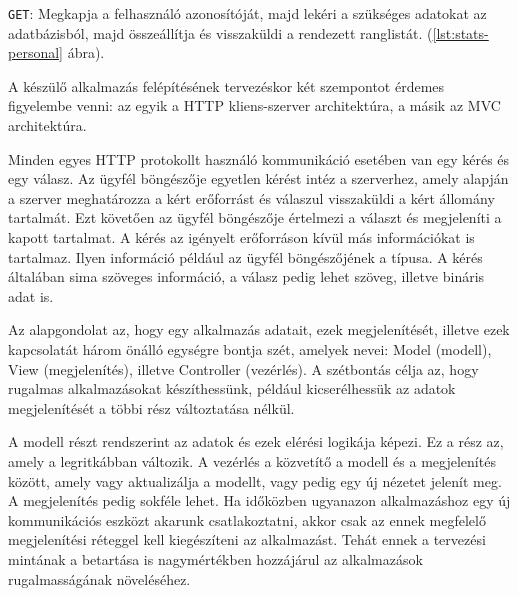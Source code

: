 \texttt{GET}: Megkapja a felhasználó azonosítóját, majd lekéri a szükséges adatokat az adatbázisból, majd összeállítja és visszaküldi a rendezett ranglistát. (\ref{lst:stats-personal} ábra).





A készülő alkalmazás felépítésének tervezéskor két szempontot érdemes figyelembe venni: az egyik a HTTP kliens-szerver architektúra, a másik az MVC architektúra.

Minden egyes HTTP protokollt használó kommunikáció esetében van egy kérés és egy válasz. Az ügyfél böngészője egyetlen kérést intéz a szerverhez, amely alapján a szerver meghatározza a kért erőforrást és válaszul visszaküldi a kért állomány tartalmát. Ezt követően az ügyfél böngészője értelmezi a választ és megjeleníti a kapott tartalmat. A kérés az igényelt erőforráson kívül más információkat is tartalmaz. Ilyen információ például az ügyfél böngészőjének a típusa. A kérés általában sima szöveges információ, a válasz pedig lehet szöveg, illetve bináris adat is. \cite{java-web-tech}

Az alapgondolat az, hogy egy alkalmazás adatait, ezek megjelenítését, illetve ezek kapcsolatát három önálló egységre bontja szét, amelyek nevei: Model (modell), View (megjelenítés), illetve Controller (vezérlés). A szétbontás célja az, hogy rugalmas alkalmazásokat készíthessünk, például kicserélhessük az adatok megjelenítését a többi rész változtatása nélkül.

A modell részt rendszerint az adatok és ezek elérési logikája képezi. Ez a rész az, amely a legritkábban változik. A vezérlés a közvetítő a modell és a megjelenítés között, amely vagy aktualizálja a modellt, vagy pedig egy új nézetet jelenít meg. A megjelenítés pedig sokféle lehet. Ha időközben ugyanazon alkalmazáshoz egy új kommunikációs eszközt akarunk csatlakoztatni, akkor csak az ennek megfelelő megjelenítési réteggel kell kiegészíteni az alkalmazást. Tehát ennek a tervezési mintának a betartása is nagymértékben hozzájárul az alkalmazások rugalmasságának növeléséhez.

